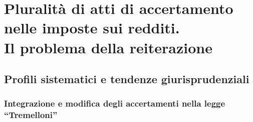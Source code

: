 \part{Pluralit\`a di atti di accertamento nelle imposte sui redditi.
\\Il problema della reiterazione}
\chapter{Profili sistematici e tendenze giurisprudenziali}
\section{Integrazione e modifica degli accertamenti nella legge ``Tremelloni''}
